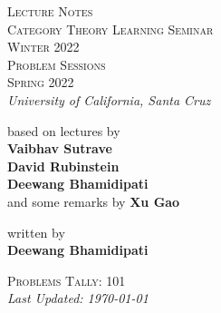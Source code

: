 \begin{titlepage}
    \centering
    \vspace*{\fill}

	\vspace{-2in}

    {\Huge
    \textsc{Lecture Notes}}\\
    \vspace{0.1in}
	{\Large
	\textsc{Category Theory Learning Seminar\\[0.5em] Winter 2022}}\\
    \vspace{0.1in}
	{\Large
	\textsc{Problem Sessions\\[0.5em] Spring 2022}}\\
	\vspace{0.5in}    
    {\Large
    \textsl{University of California, Santa Cruz}}
	
    \vspace*{0.5in}

	\Large  
	based on lectures by \\[0.2em] 
    \textbf{Vaibhav Sutrave\\[0.2em] David Rubinstein\\[0.2em] Deewang Bhamidipati}\\[0.2em] and some remarks by \textbf{Xu Gao}
	
    \vspace*{0.5in}

	\Large  
	written by\\[0.2em]
    \textbf{Deewang Bhamidipati}

	\vspace*{\fill}
	{\normalsize
	\textsc{Problems Tally: 101}\\[1em]
    \textsl{Last Updated: \today}}
    \end{titlepage}
    
\tableofcontents
\pagebreak
